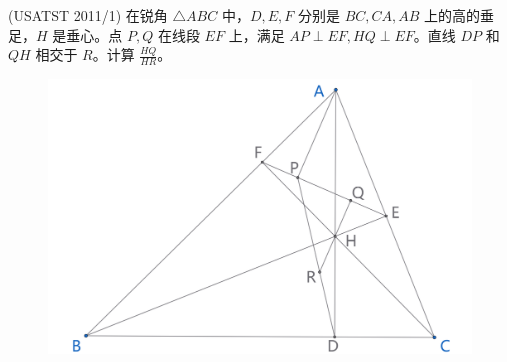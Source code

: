  
\begin{exercise}
    (USATST 2011/1) 在锐角 $\triangle ABC$ 中，$D, E, F$ 分别是 $BC, CA, AB$ 上的高的垂足，$H$ 是垂心。点 $P, Q$ 在线段 $EF$ 上，满足 $AP \perp EF, HQ \perp EF$。直线 $DP$ 和 $QH$ 相交于 $R$。计算 $\frac{HQ}{HR}$。
\end{exercise}
\begin{figure}[H]
    \centering
    \includegraphics[width=0.7\linewidth]{figures/exercises/445.png}
\end{figure}